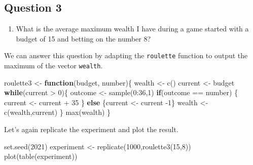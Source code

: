 \documentclass[
]{book}
\newenvironment{Shaded}{\begin{snugshade}}{\end{snugshade}}
\newcommand{\ControlFlowTok}[1]{\textcolor[rgb]{0.13,0.29,0.53}{\textbf{#1}}}
\newcommand{\DecValTok}[1]{\textcolor[rgb]{0.00,0.00,0.81}{#1}}
\newcommand{\FunctionTok}[1]{\textcolor[rgb]{0.00,0.00,0.00}{#1}}
\newcommand{\NormalTok}[1]{#1}
\newcommand{\OtherTok}[1]{\textcolor[rgb]{0.56,0.35,0.01}{#1}}
\newcommand{\SpecialCharTok}[1]{\textcolor[rgb]{0.00,0.00,0.00}{#1}}
\providecommand{\tightlist}{%
  \setlength{\itemsep}{0pt}\setlength{\parskip}{0pt}}
\begin{document}
\hypertarget{question-3}{%
\subsection{Question 3}\label{question-3}}

\begin{enumerate}
\def\labelenumi{\arabic{enumi}.}
\setcounter{enumi}{2}
\tightlist
\item
  What is the average maximum wealth I have during a game started with a budget of 15 and betting on the number 8?
\end{enumerate}

We can answer this question by adapting the \texttt{roulette} function to output the maximum of the vector \texttt{wealth}.

\begin{Shaded}
\begin{Highlighting}[]
\NormalTok{roulette3 }\OtherTok{\textless{}{-}} \ControlFlowTok{function}\NormalTok{(budget, number)\{}
\NormalTok{  wealth }\OtherTok{\textless{}{-}} \FunctionTok{c}\NormalTok{()}
\NormalTok{  current }\OtherTok{\textless{}{-}}\NormalTok{ budget}
  \ControlFlowTok{while}\NormalTok{(current }\SpecialCharTok{\textgreater{}} \DecValTok{0}\NormalTok{)\{}
\NormalTok{    outcome }\OtherTok{\textless{}{-}} \FunctionTok{sample}\NormalTok{(}\DecValTok{0}\SpecialCharTok{:}\DecValTok{36}\NormalTok{,}\DecValTok{1}\NormalTok{)}
    \ControlFlowTok{if}\NormalTok{(outcome }\SpecialCharTok{==}\NormalTok{ number) \{}
\NormalTok{      current }\OtherTok{\textless{}{-}}\NormalTok{ current }\SpecialCharTok{+} \DecValTok{35}
\NormalTok{    \}}
    \ControlFlowTok{else}\NormalTok{ \{current }\OtherTok{\textless{}{-}}\NormalTok{ current }\SpecialCharTok{{-}}\DecValTok{1}\NormalTok{\}}
\NormalTok{    wealth }\OtherTok{\textless{}{-}} \FunctionTok{c}\NormalTok{(wealth,current)}
\NormalTok{  \}}
  \FunctionTok{max}\NormalTok{(wealth)}
\NormalTok{\}}
\end{Highlighting}
\end{Shaded}

Let's again replicate the experiment and plot the result.

\begin{Shaded}
\begin{Highlighting}[]
\FunctionTok{set.seed}\NormalTok{(}\DecValTok{2021}\NormalTok{)}
\NormalTok{experiment }\OtherTok{\textless{}{-}} \FunctionTok{replicate}\NormalTok{(}\DecValTok{1000}\NormalTok{,}\FunctionTok{roulette3}\NormalTok{(}\DecValTok{15}\NormalTok{,}\DecValTok{8}\NormalTok{))}
\FunctionTok{plot}\NormalTok{(}\FunctionTok{table}\NormalTok{(experiment))}
\end{Highlighting}
\end{Shaded}
\end{document}
